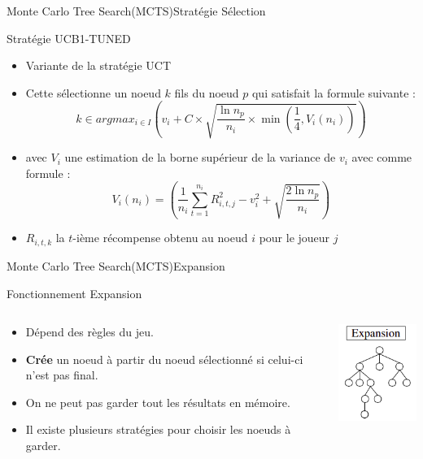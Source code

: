 \begin{frame}{Monte Carlo Tree Search(MCTS)}{Stratégie Sélection}
	\begin{block}{Stratégie UCB1-TUNED}
		\begin{itemize}
			\item Variante de la stratégie UCT
			\item Cette sélectionne un noeud $k$ fils du noeud $p$ qui satisfait la formule suivante :
			$$k \in argmax_{i\in I}(v_{i} + C \times \sqrt{\frac{\ln n_{p}}{n_{i}}\times \min(\frac{1}{4}, V_{i}(n_{i}))})$$
			\item avec $V_{i}$ une estimation de la borne supérieur de la variance de $v_{i}$ avec comme formule :
			$$V_{i}(n_{i}) = (\frac{1}{n_{i}}\sum_{t=1}^{n_{i}}R_{i,t,j}^2 - v_{i}^2 + \sqrt{\frac{2\ln n_{p}}{n_{i}}})$$
			\item $R_{i,t,k}$ la $t$-ième récompense obtenu au noeud $i$ pour le joueur $j$
		\end{itemize}
	\end{block}
\end{frame}

\begin{frame}{Monte Carlo Tree Search(MCTS)}{Expansion}
	\begin{block}{Fonctionnement Expansion}
		\begin{columns}
			\begin{column}{8cm}
				\begin{itemize}
					\item Dépend des règles du jeu.
					\item \textbf{Crée} un noeud à partir du noeud sélectionné si celui-ci n'est pas final.
					\item On ne peut pas garder tout les résultats en mémoire.
					\item Il existe plusieurs stratégies pour choisir les noeuds à garder.
				\end{itemize}
			\end{column}
			\begin{column}{4cm}
				\includegraphics[width=3cm]{ressources/MCTS/Expansion.png}
			\end{column}
		\end{columns}
	\end{block}
\end{frame}

